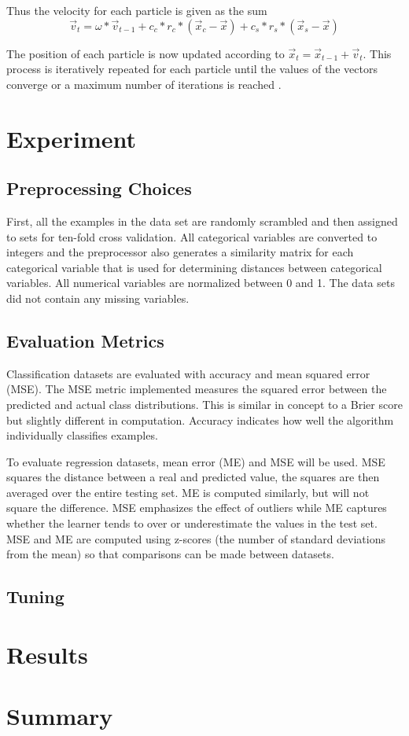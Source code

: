 \documentclass[twoside,11pt]{article}
\begin{document}
	Thus the velocity for each particle is given as the sum
	$$\vec{v}_t = \omega * \vec{v}_{t-1} + c_c*r_c*(\vec{x}_c - \vec{x}) + c_s*r_s*(\vec{x}_s - \vec{x})$$
	
	The position of each particle is now updated according to $\vec{x}_t = \vec{x}_{t-1} + \vec{v}_t$. This process is iteratively repeated for each particle until the values of the vectors converge or a maximum number of iterations is reached \citep{og-pso}.
		
\section{Experiment}

\subsection{Preprocessing Choices}

	First, all the examples in the data set are randomly scrambled and then assigned to sets for ten-fold cross validation. 
	All categorical variables are converted to integers 
	and the preprocessor also generates a similarity matrix for each categorical variable that is used for determining distances between categorical variables. 
	All numerical variables are normalized between 0 and 1. 
	The data sets did not contain any missing variables.

\subsection{Evaluation Metrics}

	Classification datasets are evaluated with accuracy and mean squared error (MSE). 
	The MSE metric implemented measures the squared error between the predicted and actual class distributions. 
	This is similar in concept to a Brier score but slightly different in computation. Accuracy indicates how well the algorithm individually classifies examples.
	
	To evaluate regression datasets, mean error (ME) and MSE will be used. MSE squares the distance between a real and predicted value, the squares are then averaged over the entire testing set. 
	ME is computed similarly, but will not square the difference. MSE emphasizes the effect of outliers while ME captures whether the learner tends to over or underestimate the values in the test set. 
	MSE and ME are computed using z-scores (the number of standard deviations from the mean) so that comparisons can be made between datasets.

\subsection{Tuning}

\section{Results}

\section{Summary}

\newpage


\end{document}

